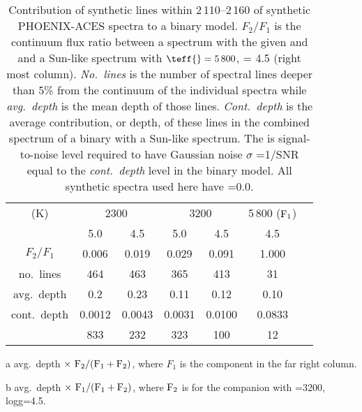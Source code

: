 
\begin{table}
    \small
    \centering
    \begin{threeparttable}[b]
        \caption{Contribution of synthetic lines within 2\,110--2\,160\nm{} of synthetic {PHOENIX-ACES} spectra to a binary model. \(F_{2}/F_{1}\) is the continuum flux ratio between a spectrum with the given \txteff{} and \logg{} and a Sun-like spectrum with \(\teff{}=5\,800\),\logg{} = 4.5 (right most column). \emph{No.\ lines} is the number of spectral lines deeper than 5\% from the continuum of the individual spectra while \emph{avg.\ depth} is the mean depth of those lines. \emph{Cont.\ depth} is the average contribution, or depth, of these lines in the combined spectrum of a binary with a Sun-like spectrum. The \snr{} is signal-to-noise level required to have Gaussian noise \(\sigma\) =1/{SNR} equal to the \emph{cont.\ depth} level in the binary model. All synthetic spectra used here have \feh{}=0.0.}
        \begin{tabular}{*7c}
            \toprule
            \teff{} (K)  & \multicolumn{2}{c}{2300} & \multicolumn{2}{c}{3200} & 5\,800 (\(\rm F_1\))\\
           \logg{} & 5.0 & 4.5  & 5.0 & 4.5 & 4.5 \\
            \midrule
            \(F_2/F_1\) & 0.006 & 0.019 & 0.029  & 0.091 & 1.000 \\
            no.\ lines & 464 & 463 & 365  & 413 & 31 \\
            avg.\ depth & 0.2  & 0.23& 0.11 & 0.12 & 0.10 \\
            cont.\ depth\tnote{a} &  0.0012 & 0.0043 &  0.0031 & 0.0100&  0.0833\tnote{b} \\
            \snr{}  & 833 & 232 & 323  & 100 & 12 \\
            \bottomrule
        \end{tabular}\label{tab:line_contributions}
        \begin{tablenotes}
            \item [a] avg.\ depth \(\times~ \rm F_2 / (F_1 + F_2)\), where \(F_1\) is the component in the far right column.
            \item[b] avg.\ depth \(\times~ \rm F_1 / (F_1 + F_2)\), where \(\rm F_2\) is for the  companion with \teff{}=3200, logg=4.5.
        \end{tablenotes}
    \end{threeparttable}
\end{table}
